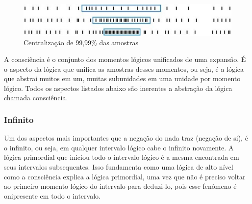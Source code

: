 \begin{figure}[H]
\caption{Centralização de 99,99\% das amostras}
\label{fig:centering_of_99_range}
\centering
\includegraphics[scale=1]{sections/images/centering_of_99_range.jpg}
\end{figure}

A consciência é o conjunto dos momentos lógicos unificados de uma expansão. É o aspecto da lógica que unifica as amostras desses momentos, ou seja, é a lógica que abstrai muitos em um, muitas subunidades em uma unidade por momento lógico. Todos os aspectos listados abaixo são inerentes a abstração da lógica chamada consciência.

\subsubsection{Infinito}
Um dos aspectos mais importantes que a negação do nada traz (negação de si), é o infinito, ou seja, em qualquer intervalo lógico cabe o infinito novamente. A lógica primordial que iniciou todo o intervalo lógico é a mesma encontrada em seus intervalos subsequentes. Isso fundamenta como uma lógica de alto nível como a consciência explica a lógica primordial, uma vez que não é preciso voltar ao primeiro momento lógico do intervalo para deduzi-lo, pois esse fenômeno é onipresente em todo o intervalo.

